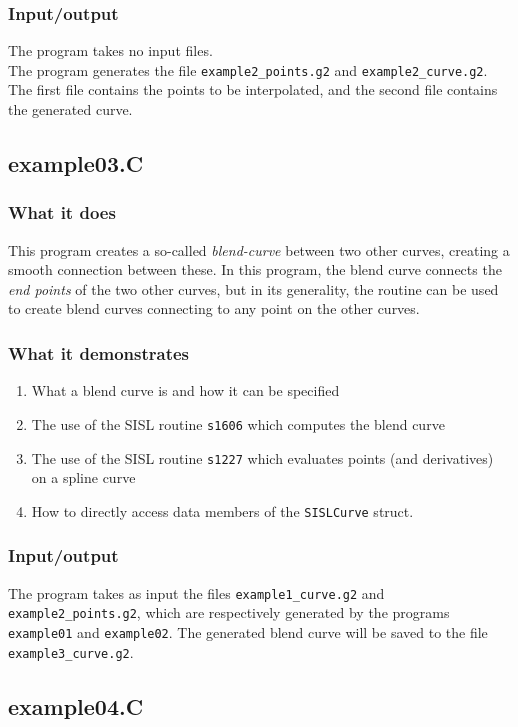 \subsubsection{Input/output}
The program takes no input files.\\
The program generates the file \verb/example2_points.g2/ and \verb/example2_curve.g2/.
The first file contains the points to be interpolated, and the second file contains the
generated curve.

\subsection{example03.C}

\subsubsection{What it does}
This program creates a so-called \emph{blend-curve} between two other curves, creating a
smooth connection between these.  In this program, the blend curve connects the \emph{end 
points} of the two other curves, but in its generality, the routine can be used to create 
blend curves connecting to any point on the other curves.

\subsubsection{What it demonstrates}
\begin{enumerate}
\item What a blend curve is and how it can be specified
\item The use of the SISL routine \verb/s1606/ which computes the blend curve
\item The use of the SISL routine \verb/s1227/ which evaluates points (and derivatives)
on a spline curve
\item How to directly access data members of the \verb/SISLCurve/ struct.
\end{enumerate}
\subsubsection{Input/output}
The program takes as input the files \verb/example1_curve.g2/ and \verb/example2_points.g2/,
which are respectively generated by the programs \verb/example01/ and \verb/example02/.
The generated blend curve will be saved to the file \verb/example3_curve.g2/.

\subsection{example04.C}

